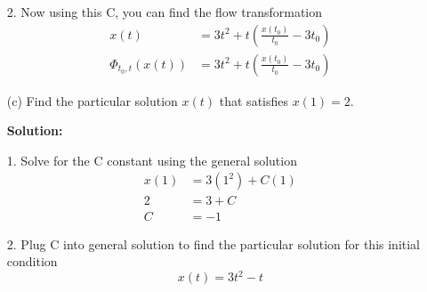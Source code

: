 \documentclass[12pt]{article}
\begin{document}
\begin{enumerate}
          2. Now using this C, you can find the flow transformation
          \begin{align*}
              x(t)               & = 3t^2+t(\frac{x(t_0)}{t_0}-3t_0) \\
              \Phi_{t_0,t}(x(t)) & =3t^2+t(\frac{x(t_0)}{t_0}-3t_0)
          \end{align*}

    \item[(c)] Find the particular solution $x(t)$ that satisfies $x(1) = 2$.

          \textbf{Solution:}

          1. Solve for the C constant using the general solution
          \begin{align*}
              x(1) & = 3(1^2) + C(1) \\
              2    & = 3 + C         \\
              C    & = -1
          \end{align*}

          2. Plug C into general solution to find the particular solution for this initial condition
          \begin{equation*}
              x(t) = 3t^2 -t
          \end{equation*}
\end{enumerate}

\newpage
\end{document}
